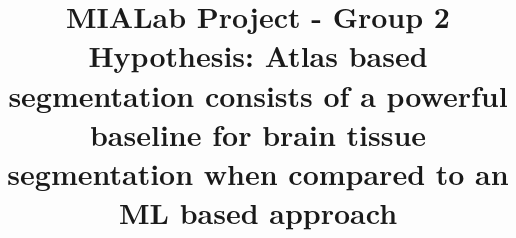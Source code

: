 \documentclass[conference]{IEEEtran}
\begin{document}
\title{MIALab Project - Group 2\\
{\footnotesize Hypothesis: Atlas based segmentation consists of a powerful baseline for brain tissue segmentation when compared to an ML based approach}
}

\author{
\and
{}
\and
{}
}

\maketitle

\begin{abstract}

\end{abstract}


% 





\end{document}

